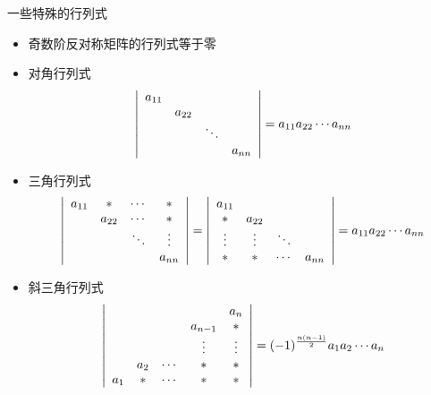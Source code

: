 \begin{frame}
  
    一些特殊的行列式
    \begin{itemize}
    \item 奇数阶反对称矩阵的行列式等于零
    \item 对角行列式
      $$
      \left|
      \begin{array}{cccc}
      a_{11}&&&\\
      &a_{22}&&\\
      &&\ddots&\\
      &&&a_{nn}        
      \end{array}
      \right|      
      =a_{11}a_{22}\cdots a_{nn}
      $$
    \item 三角行列式
      $$
      \left|
      \begin{array}{cccc}
      a_{11}&*&\cdots&*\\
      &a_{22}&\cdots&*\\
      &&\ddots&\vdots\\
      &&&a_{nn}        
      \end{array}
      \right|
      =\left|
      \begin{array}{cccc}
      a_{11}&&&\\
      *&a_{22}&&\\
      \vdots&\vdots&\ddots&\\
      *&*&\cdots&a_{nn}        
      \end{array}
      \right|
      =a_{11}a_{22}\cdots a_{nn}
      $$
    \item 斜三角行列式
      $$
    \left|
    \begin{array}{ccccc}
        &   & &  & a_n \\
        &   & & a_{n-1} & * \\
       &  & & \vdots & \vdots\\  
        &  a_2 & \cdots & * & * \\
      a_1 & * & \cdots & * & *
    \end{array}
    \right| = (-1)^{\frac{n(n-1)}2}
    a_1a_2\cdots a_{n}
    $$
    \end{itemize}
  
\end{frame}


